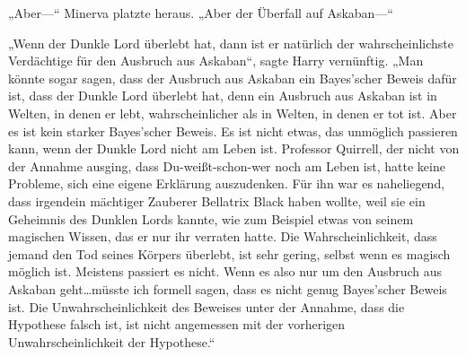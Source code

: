 „Aber—“ Minerva platzte heraus. „Aber der Überfall auf Askaban—“

„Wenn der Dunkle Lord überlebt hat, dann ist er natürlich der wahrscheinlichste Verdächtige für den Ausbruch aus Askaban“, sagte Harry vernünftig. „Man könnte sogar sagen, dass der Ausbruch aus Askaban ein Bayes’scher Beweis dafür ist, dass der Dunkle Lord überlebt hat, denn ein Ausbruch aus Askaban ist in Welten, in denen er lebt, wahrscheinlicher als in Welten, in denen er tot ist. Aber es ist kein starker Bayes’scher Beweis. Es ist nicht etwas, das unmöglich passieren kann, wenn der Dunkle Lord nicht am Leben ist. Professor Quirrell, der nicht von der Annahme ausging, dass Du-weißt-schon-wer noch am Leben ist, hatte keine Probleme, sich eine eigene Erklärung auszudenken. Für ihn war es naheliegend, dass irgendein mächtiger Zauberer Bellatrix Black haben wollte, weil sie ein Geheimnis des Dunklen Lords kannte, wie zum Beispiel etwas von seinem magischen Wissen, das er nur ihr verraten hatte. Die Wahrscheinlichkeit, dass jemand den Tod seines Körpers überlebt, ist sehr gering, selbst wenn es magisch möglich ist. Meistens passiert es nicht. Wenn es also nur um den Ausbruch aus Askaban geht…müsste ich formell sagen, dass es nicht genug Bayes’scher Beweis ist. Die Unwahrscheinlichkeit des Beweises unter der Annahme, dass die Hypothese falsch ist, ist nicht angemessen mit der vorherigen Unwahrscheinlichkeit der Hypothese.“

